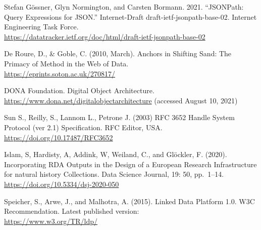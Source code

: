 \begin{thebibliography}{9}
Stefan Gössner, Glyn Normington, and Carsten Bormann. 2021.
``JSONPath: Query Expressions for JSON.'' Internet-Draft
draft-ietf-jsonpath-base-02. Internet Engineering Task Force.\\
\url{https://datatracker.ietf.org/doc/html/draft-ietf-jsonpath-base-02}

De Roure, D., \& Goble, C. (2010, March). Anchors in Shifting
Sand: The Primacy of Method in the Web of Data.\\
\url{https://eprints.soton.ac.uk/270817/}

DONA Foundation. Digital Object Architecture.\\
\url{https://www.dona.net/digitalobjectarchitecture} (accessed August
10, 2021)

Sun S., Reilly, S., Lannom L., Petrone J. (2003) RFC 3652
Handle System Protocol (ver 2.1) Specification. RFC Editor, USA.\\
\url{https://doi.org/10.17487/RFC3652}

Islam, S, Hardisty, A, Addink, W, Weiland, C., and Glöckler, F.
(2020). Incorporating RDA Outputs in the Design of a European Research
Infrastructure for natural history Collections. Data Science Journal,
19: 50, pp.~1--14.\\
\url{https://doi.org/10.5334/dsj-2020-050}

Speicher, S., Arwe, J., and Malhotra, A. (2015). Linked Data
Platform 1.0. W3C Recommendation. Latest published version:\\
\url{https://www.w3.org/TR/ldp/}


\end{thebibliography}

